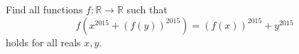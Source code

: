 Find all functions $f:\mathbb{R}\to\mathbb{R}$ such that \[f\left(x^{2015}+\left(f\left(y\right)\right)^{2015}\right)=\left(f\left(x\right)\right)^{2015}+y^{2015}\] holds for all reals $x,y$.